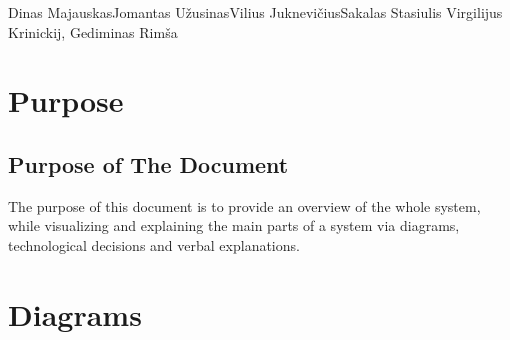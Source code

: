 \documentclass[a4paper,12pt,fleqn]{article}
\begin{document}
 {Dinas Majauskas}{Jomantas Užusinas}{Vilius Juknevičius}{Sakalas Stasiulis}%
 {Virgilijus Krinickij, Gediminas Rimša}

\tableofcontents


\newpage
\section{Purpose}

\subsection{Purpose of The Document}
The purpose of this document is to provide an overview of the whole system, while visualizing and explaining the main parts of a system via diagrams, technological decisions and verbal explanations. 

\section{Diagrams}
\end{document}
